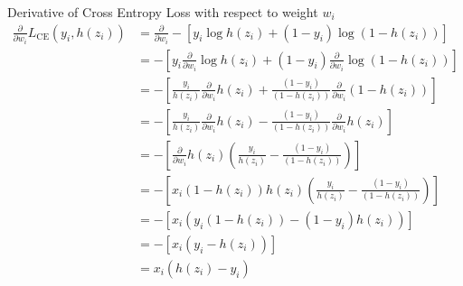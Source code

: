 Derivative of Cross Entropy Loss with respect to weight $w_i$\\
\begin{align*}
    \frac{\partial}{\partial w_i} L_{\text{CE}}(y_i, h(z_i)) &=
    \frac{\partial}{\partial w_i} -\left[y_i \log h(z_i) + (1-y_i) \log (1-h(z_i))\right]\\
    &= -\left[ y_i \frac{\partial}{\partial w_i} \log h(z_i) + (1-y_i) \frac{\partial}{\partial w_i} \log (1 - h(z_i)) \right]\\
    &= -\left[ \frac{y_i}{h(z_i)} \frac{\partial}{\partial w_i} h(z_i) + \frac{(1-y_i)}{(1-h(z_i))} \frac{\partial}{\partial w_i} (1 - h(z_i)) \right]\\
    &= -\left[ \frac{y_i}{h(z_i)} \frac{\partial}{\partial w_i} h(z_i) - \frac{(1-y_i)}{(1-h(z_i))} \frac{\partial}{\partial w_i} h(z_i)\right]\\
    &= -\left[ \frac{\partial}{\partial w_i} h(z_i) \left(\frac{y_i}{h(z_i)} - \frac{(1-y_i)}{(1-h(z_i))}\right)\right]\\
    &= -\left[ x_i(1-h(z_i))h(z_i) \left(\frac{y_i}{h(z_i)} - \frac{(1-y_i)}{(1-h(z_i))}\right)\right]\\
    &= -\left[ x_i \left(y_i(1-h(z_i)) - (1-y_i)h(z_i)\right)\right]\\
    &= -\left[ x_i (y_i - h(z_i))\right]\\
    &= x_i (h(z_i) - y_i) \\
\end{align*}

